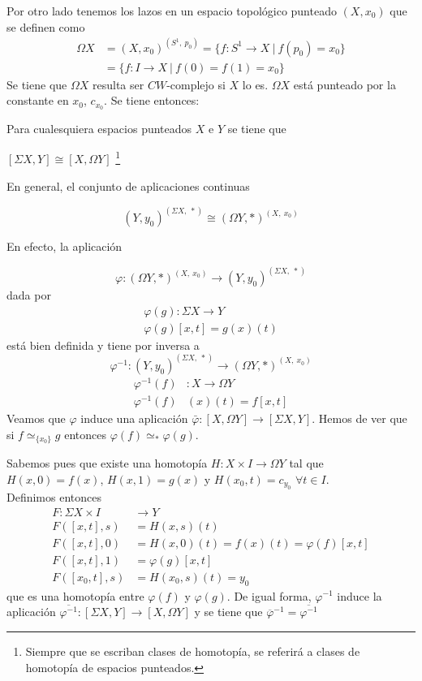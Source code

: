 Por otro lado tenemos los lazos en un espacio topológico punteado $(X, x_0)$ que se definen como
\begin{align*}
\Omega X &= (X, x_0)^{(S^1, \ p_0)} = \{ f : S^1 \longrightarrow X \ \vert \ f(p_0)  = x_0 \} \\ 
&= \{ f : I \longrightarrow X \ \vert \ f(0) = f(1) = x_0 \}
\end{align*}
Se tiene que $\Omega X$ resulta ser $CW$-complejo si $X$ lo es. $\Omega X$ está punteado por la constante en $x_0$, $c_{x_0}$. Se tiene entonces: 
\begin{teor}
Para cualesquiera espacios punteados $X$ e  $Y$ se tiene que 
\begin{center}
$[\Sigma X, Y ] \cong [X, \Omega Y]$ \footnote{Siempre que se escriban clases de homotopía, se referirá a clases de homotopía de espacios punteados.}
\end{center}
\end{teor}
\begin{demo}
En general, el conjunto de aplicaciones continuas 

\[ (Y, y_0)^{(\Sigma X, \ \ast)} \cong (\Omega Y, \ast)^{(X, \ x_0)} \]

En efecto, la aplicación

\[ \varphi : (\Omega Y, \ast)^{(X, \ x_0)} \longrightarrow (Y, y_0)^{(\Sigma X, \ \ast)} \]
dada por 
\begin{align*}
\varphi (g) : \Sigma X \longrightarrow Y \\
\varphi (g)[x, t] = g(x)(t)
\end{align*} 
está bien definida y tiene por inversa a 
\[ \varphi^{-1} : (Y,  y_0)^{(\Sigma X, \ \ast)} \longrightarrow (\Omega Y, \ast)^{(X, \ x_0)} \]
\begin{align*}
\varphi^{-1} (f)& : X \longrightarrow \Omega Y \\
\varphi^{-1}(f)&(x)(t) = f[x, t]
\end{align*}
Veamos que $\varphi$ induce una aplicación $\bar{\varphi} : [X, \Omega Y] \longrightarrow [\Sigma X, Y] $. Hemos de ver que si $f \simeq_{\{ x_0 \}} g$ entonces $\varphi (f) \simeq_{\ast} \varphi (g)$. \par
Sabemos pues que existe una homotopía $H: X \times I \longrightarrow \Omega Y$ tal que $H(x,0) = f(x) $, $H(x,1) = g(x)$ y 
$H(x_0, t) = c_{y_0}$ $\forall t \in I$.\\
Definimos entonces 
\begin{align*}
F: \Sigma X \times I &\longrightarrow Y \\
F([x,t],s) &= H(x,s)(t) \\
F([x,t],0) &= H(x,0)(t) = f(x)(t) = \varphi(f)[x,t] \\
F([x,t], 1) &= \varphi(g)[x,t] \\
F([x_0,t],s) &= H(x_0, s)(t) = y_0
\end{align*}
que es una homotopía entre $\varphi (f)$ y $\varphi (g)$.
De igual forma, $\varphi^{-1}$ induce la aplicación $\overline{\varphi^{-1}} : [\Sigma X, Y] \longrightarrow [X, \Omega Y]$ y se tiene que $\overline{\varphi}^{-1} = \overline{\varphi^{-1}}$\\
\end{demo}

